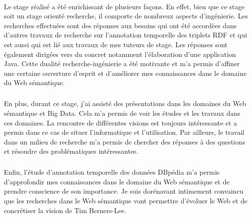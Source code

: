 \documentclass[12pt,a4	]{report}
\begin{document}
\paragraph{}
Le stage réalisé a été enrichissant de plusieurs façons. En effet, bien que ce stage soit un stage orienté recherche, il comporte de nombreux aspects d'ingénierie. Les recherches effectuées sont des réponses aux besoins qui ont été accordées dans d'autres travaux de recherche sur l'annotation temporelle des triplets RDF et qui est aussi qui est lié aux travaux de mes tuteurs de stage. Les réponses sont également dirigées vers du concret notamment l'élaboration d'une application Java. Cette dualité recherche-ingénierie a été motivante et m'a permis d'affiner une certaine ouverture d'esprit et d'améliorer mes connaissances dans le domaine du Web sémantique.
\subparagraph{}
En plus, durant ce stage, j'ai assisté des présentations dans les domaines du Web sémantique et Big Data. Cela m'a permis de voir les études et les travaux dans ces domaines. La rencontre de différentes visions est toujours intéressante et a permis dans ce cas de situer l'informatique et l'utilisation. Par ailleurs, le travail dans un milieu de recherche m'a permis de chercher des réponses à des questions et résoudre des problématiques intéressantes.
\subparagraph{}
Enfin, l'étude d'annotation temporelle des données DBpédia m'a permis d'approfondir mes connaissances dans le domaine du Web sémantique et de prendre conscience de son importance. Je suis dorénavant intimement convaincu que les recherches dans le Web sémantique vont permettre d'évoluer le Web et de concrétiser la vision de Tim Berners-Lee.  
\end{document}
